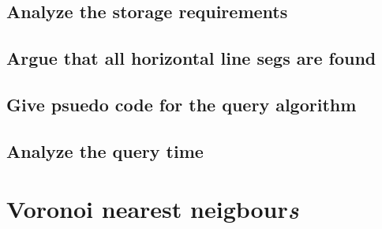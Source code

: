 \documentclass{article}
\begin{document}
\subsection{Analyze the storage requirements}
\subsection{Argue that all horizontal line segs are found}
\subsection{Give psuedo code for the query algorithm}

\subsection{Analyze the query time}

\section{Voronoi nearest neigbour\emph{s}}
\end{document}
